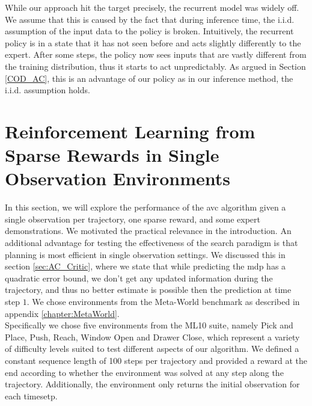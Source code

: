 While our approach hit the target precisely, the recurrent model was widely off. We assume that this is caused by the fact that during inference 
time, the
i.i.d. assumption of the input data to the policy is broken. Intuitively, the recurrent policy
is in a state that it has not seen before and acts slightly differently to the expert. After some steps, the policy now sees 
inputs that are vastly
different from the training distribution, thus it starts to act unpredictably. As argued in Section \ref{COD_AC}, this is an advantage of our 
policy as in our inference method, the i.i.d. assumption holds.

\section{Reinforcement Learning from Sparse Rewards in Single Observation Environments}
In this section, we will explore the performance of the \ac{avc} algorithm given a single observation per trajectory, one sparse reward, and some expert demonstrations.
We motivated the practical relevance in the introduction. An additional advantage for testing the effectiveness of the search paradigm is that planning is most efficient in
single observation settings.
We discussed this in section \ref{sec:AC_Critic}, where we state that while predicting the \ac{mdp} has a quadratic error bound, we don't get any updated information
during the trajectory, and thus no better estimate is possible then the prediction at time step $1$. 
We chose environments from the Meta-World benchmark as described in appendix \ref{chapter:MetaWorld}. \\

Specifically we chose five environments from the ML10 suite, namely Pick and Place, Push, Reach, Window Open and Drawer Close, which represent a variety
of difficulty levels suited to test different aspects of our algorithm. We defined a constant sequence length of 100 steps per trajectory and provided
a reward at the end according to whether the environment was solved at any step along the trajectory. Additionally, the environment
only returns the initial observation for each timesetp.\\

